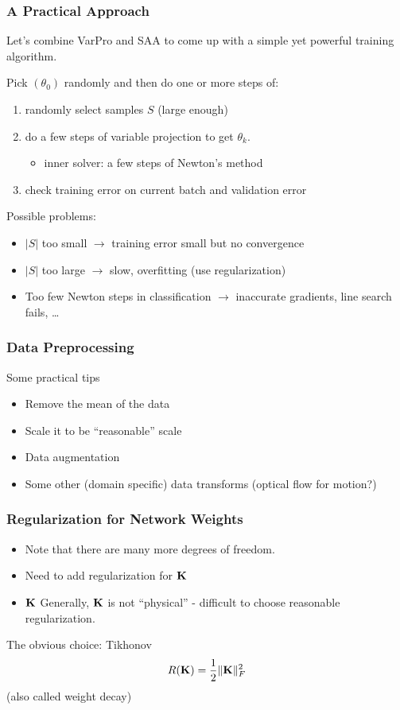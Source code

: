 \documentclass[12pt,fleqn]{beamer}
\begin{document}
\begin{frame}
	\frametitle{A Practical Approach}
	
	Let's combine VarPro and SAA to come up with a simple yet powerful training algorithm.
	
	\bigskip
	\pause
	
	Pick $(\theta_0)$ randomly and then do one or more steps of:
	\begin{enumerate}
		\item randomly select samples $S$ (large enough)
		\item do a few steps of variable projection to get $\theta_k$.
		\begin{itemize}
			\item inner solver: a few steps of Newton's method
		\end{itemize}
		\item check training error on current batch and validation error
	\end{enumerate}
	
	\bigskip
	\pause
	
	Possible problems:
	\begin{itemize}
		\item $|S|$ too small $\rightarrow$ training error small but no convergence
		\item $|S|$ too large $\rightarrow$ slow, overfitting (use regularization)
		\item Too few Newton steps in classification $\rightarrow$ inaccurate gradients, line search fails, \ldots
	\end{itemize}	
\end{frame}

\begin{frame}[fragile]\frametitle{Data Preprocessing}

Some practical tips
\begin{itemize}
\item Remove the mean of the data
\item Scale it to be ``reasonable'' scale
\item Data augmentation
\item Some other (domain specific) data transforms (optical flow for motion?)
\end{itemize}

\end{frame}

\begin{frame}[fragile]\frametitle{Regularization for Network Weights}

\begin{itemize}
\item
Note that there are many more degrees of freedom.
\item
Need to add regularization for ${\bf K}$
\item
${\bf K}$ Generally, ${\bf K}$ is not ``physical'' - difficult to choose reasonable
regularization.
\end{itemize}

\bigskip

The obvious choice: Tikhonov
$$ R({\bf K}) = {\frac 12} \|{\bf K}\|^2_F $$
(also called weight decay)


\end{frame}
\end{document}
